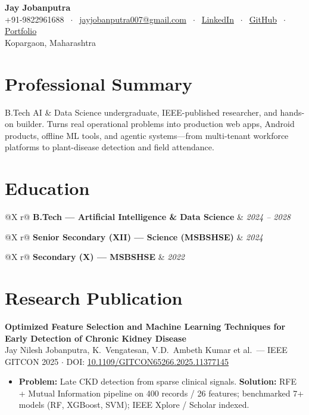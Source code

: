 \documentclass[9pt,a4paper]{extarticle}
\makeatletter
\newcommand{\role}[3]{%
  \noindent
  \begin{tabularx}{\textwidth}{@{}X r@{}}
    \textbf{#1} & \textit{\footnotesize #3} \\
    \multicolumn{2}{@{}l@{}}{\textcolor{muted}{\footnotesize #2}}
  \end{tabularx}\par\vspace{0.08em}%
}
\makeatother
\begin{document}
\RaggedRight

\begin{center}
  {\LARGE\bfseries Jay Jobanputra}\\[0.22em]
  {\footnotesize
    +91-9822961688
    $\;\cdot\;$
    \href{mailto:jayjobanputra007@gmail.com}{jayjobanputra007@gmail.com}
    $\;\cdot\;$
    \href{https://www.linkedin.com/in/jay-jobanputra-1b442931b}{LinkedIn}
    $\;\cdot\;$
    \href{https://github.com/jay-07-pixel}{GitHub}
    $\;\cdot\;$
    \href{https://jay.portfolio.kalpanik.in/}{Portfolio}
  }\\[0.1em]
  {\footnotesize Kopargaon, Maharashtra}
\end{center}

\vspace{0.1em}

\section*{Professional Summary}
B.Tech AI \& Data Science undergraduate, IEEE-published researcher, and hands-on builder. Turns real operational problems into production web apps, Android products, offline ML tools, and agentic systems---from multi-tenant workforce platforms to plant-disease detection and field attendance.

\section*{Education}
\role{B.Tech --- Artificial Intelligence \& Data Science}{Sanjivani University, Kopargaon}{2024 -- 2028}
\vspace{0.06em}
\role{Senior Secondary (XII) --- Science (MSBSHSE)}{K.\ B.\ Rohmare Jr.\ College, Kopargaon \quad 63\%}{2024}
\vspace{0.05em}
\role{Secondary (X) --- MSBSHSE}{Shri Sharda English Medium School, Kopargaon \quad 91.40\%}{2022}

\section*{Research Publication}
\textbf{Optimized Feature Selection and Machine Learning Techniques for Early Detection of Chronic Kidney Disease}\\[0.04em]
{\footnotesize Jay Nilesh Jobanputra, K.\ Vengatesan, V.D.\ Ambeth Kumar et al.\ --- IEEE GITCON 2025 $\cdot$ DOI: \href{https://doi.org/10.1109/GITCON65266.2025.11377145}{10.1109/GITCON65266.2025.11377145}}
\begin{itemize}
  \item \textbf{Problem:} Late CKD detection from sparse clinical signals. \textbf{Solution:} RFE + Mutual Information pipeline on 400 records / 26 features; benchmarked 7+ models (RF, XGBoost, SVM); IEEE Xplore / Scholar indexed.
\end{itemize}
\end{document}
